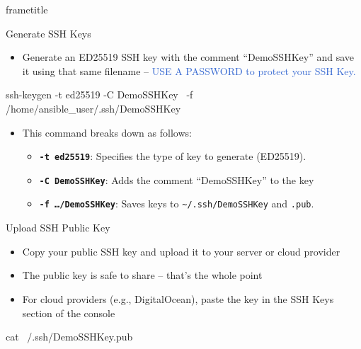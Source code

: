 \documentclass[aspectratio=169,12pt]{beamer}
\begin{document}
\begin{frame}[plain]
\vspace{3cm}
\begin{beamercolorbox}[wd=\paperwidth,ht=2.5cm,dp=0.8cm]{frametitle}
\end{beamercolorbox}
\end{frame}

\begin{frame}[fragile]{Generate SSH Keys}
\begin{itemize}
  \item Generate an ED25519 SSH key with the comment ``DemoSSHKey'' and save it using that same filename -- \textcolor{highlight}{USE A PASSWORD to protect your SSH Key.}
\end{itemize}
\vspace{0.1cm}
\begin{codebash}
ssh-keygen -t ed25519 -C DemoSSHKey \
  -f /home/ansible_user/.ssh/DemoSSHKey
\end{codebash}
\begin{itemize}
  \item This command breaks down as follows:
  \begin{itemize}
    \item \textbf{\texttt{-t ed25519}}: Specifies the type of key to generate (ED25519).
    \item \textbf{\texttt{-C DemoSSHKey}}: Adds the comment ``DemoSSHKey'' to the key
    \item \textbf{\texttt{-f \ldots/DemoSSHKey}}: Saves keys to \texttt{\textasciitilde/.ssh/DemoSSHKey} and \texttt{.pub}.
  \end{itemize}
\end{itemize}
\end{frame}

\begin{frame}[fragile]{Upload SSH Public Key}
\begin{itemize}
  \item Copy your public SSH key and upload it to your server or cloud provider
  \item The public key is safe to share -- that's the whole point
  \item For cloud providers (e.g., DigitalOcean), paste the key in the SSH Keys section of the console
\end{itemize}
\vspace{0.3cm}
\begin{codebash}
cat ~/.ssh/DemoSSHKey.pub
\end{codebash}
\end{frame}
\end{document}
